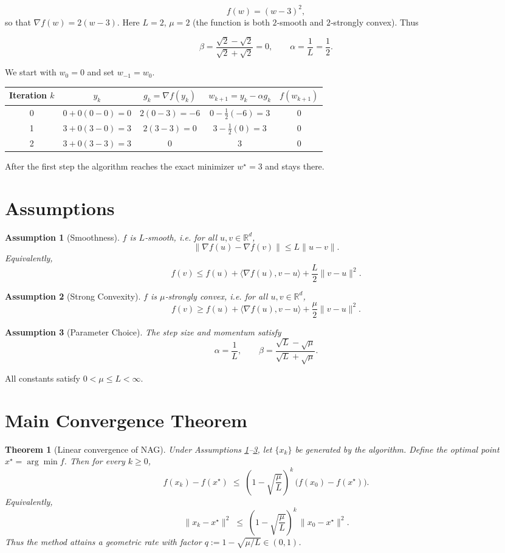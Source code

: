\documentclass{article}
\newtheorem{theorem}{Theorem}[section]
\newtheorem{assumption}{Assumption}[section]
\begin{document}
\[
f(w) = (w-3)^2,
\]
so that $\nabla f(w)=2(w-3)$.  
Here $L=2$, $\mu=2$ (the function is both $2$‑smooth and $2$‑strongly convex).  
Thus  

\[
\beta = \frac{\sqrt{2}-\sqrt{2}}{\sqrt{2}+\sqrt{2}} = 0,\qquad
\alpha = \frac1L = \frac12.
\]

We start with $w_0=0$ and set $w_{-1}=w_0$.

\begin{center}
\begin{tabular}{c|c|c|c|c}
Iteration $k$ & $y_k$ & $g_k=\nabla f(y_k)$ & $w_{k+1}=y_k-\alpha g_k$ & $f(w_{k+1})$\\\hline
0 & $0+0(0-0)=0$ & $2(0-3)=-6$ & $0-\frac12(-6)=3$ & $0$\\
1 & $3+0(3-0)=3$ & $2(3-3)=0$ & $3-\frac12(0)=3$ & $0$\\
2 & $3+0(3-3)=3$ & $0$ & $3$ & $0$
\end{tabular}
\end{center}

After the first step the algorithm reaches the exact minimizer $w^\star=3$ and stays there.

\section*{Assumptions}
\begin{assumption}[Smoothness]\label{as:smooth}
$f$ is $L$‑smooth, i.e. for all $u,v\in\mathbb{R}^d$,
\[
\|\nabla f(u)-\nabla f(v)\| \le L\|u-v\|.
\]
Equivalently,
\[
f(v) \le f(u) + \langle\nabla f(u),v-u\rangle + \frac{L}{2}\|v-u\|^2.
\tag{A1}
\]
\end{assumption}

\begin{assumption}[Strong Convexity]\label{as:strong}
$f$ is $\mu$‑strongly convex, i.e. for all $u,v\in\mathbb{R}^d$,
\[
f(v) \ge f(u) + \langle\nabla f(u),v-u\rangle + \frac{\mu}{2}\|v-u\|^2.
\tag{A2}
\]
\end{assumption}

\begin{assumption}[Parameter Choice]\label{as:param}
The step size and momentum satisfy
\[
\alpha = \frac1L,\qquad 
\beta = \frac{\sqrt{L}-\sqrt{\mu}}{\sqrt{L}+\sqrt{\mu}}.
\tag{A3}
\]
\end{assumption}

All constants satisfy $0<\mu\le L <\infty$.

\section*{Main Convergence Theorem}
\begin{theorem}[Linear convergence of NAG]\label{thm:linear}
Under Assumptions \ref{as:smooth}–\ref{as:param}, let $\{x_k\}$ be generated by the algorithm. Define the optimal point $x^\star=\arg\min f$. Then for every $k\ge 0$,
\[
\boxed{
f(x_k)-f(x^\star) \;\le\;
\left(1-\sqrt{\frac{\mu}{L}}\right)^{k}\,
\bigl(f(x_0)-f(x^\star)\bigr).
}
\tag{T1}
\]
Equivalently,
\[
\|x_k-x^\star\|^2 \;\le\;
\left(1-\sqrt{\frac{\mu}{L}}\right)^{k}\,
\|x_0-x^\star\|^2.
\tag{T2}
\]
Thus the method attains a geometric rate with factor $q:=1-\sqrt{\mu/L}\in(0,1)$.
\end{theorem}
\end{document}
